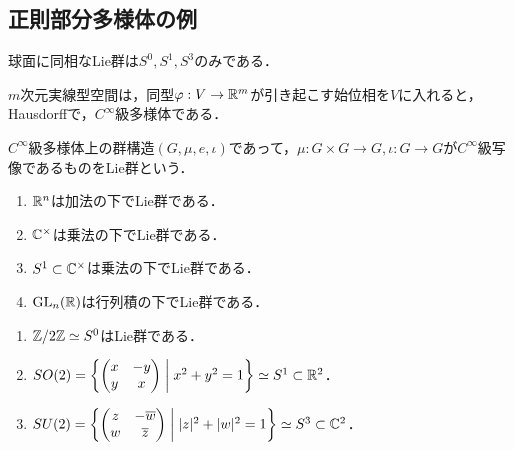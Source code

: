 \documentclass[uplatex,dvipdfmx]{jsreport}
\begin{document}
\subsection{正則部分多様体の例}

\begin{tcolorbox}[colframe=ForestGreen, colback=ForestGreen!10!white,breakable,colbacktitle=ForestGreen!40!white,coltitle=black,fonttitle=\bfseries\sffamily,
title=]
    球面に同相なLie群は$S^0,S^1,S^3$のみである．
\end{tcolorbox}

\begin{example}
    $m$次元実線型空間は，同型$\varphi:V\to\mathbb{R}^m$が引き起こす始位相を$V$に入れると，Hausdorffで，$C^\infty$級多様体である．
\end{example}

\begin{definition}
    $C^\infty$級多様体上の群構造$(G,\mu,e,\iota)$であって，$\mu:G\times G\to G,\iota:G\to G$が$C^\infty$級写像であるものをLie群という．
\end{definition}

\begin{example}\mbox{}
    \begin{enumerate}
        \item $\mathbb{R}^n$は加法の下でLie群である．
        \item $\mathbb{C}^\times$は乗法の下でLie群である．
        \item $S^1\subset\mathbb{C}^\times$は乗法の下でLie群である．
        \item $\mathrm{GL}_n(\mathbb{R})$は行列積の下でLie群である．
    \end{enumerate}
\end{example}

\begin{example}[球面と微分同相なLie群]\mbox{}
    \begin{enumerate}
        \item $\mathbb{Z}/2\mathbb{Z}\simeq S^0$はLie群である．
        \item $SO(2)=\left\{\begin{pmatrix}x&-y\\y&x\end{pmatrix}\;\middle|\;x^2+y^2=1\right\}\simeq S^1\subset\mathbb{R}^2$．
        \item $SU(2)=\left\{\begin{pmatrix}z&-\overline{w}\\w&\overline{z}\end{pmatrix}\;\middle|\;\lvert z\rvert^2+\lvert w\rvert^2=1\right\}\simeq S^3\subset\mathbb{C}^2$．
    \end{enumerate}
\end{example}
\end{document}
